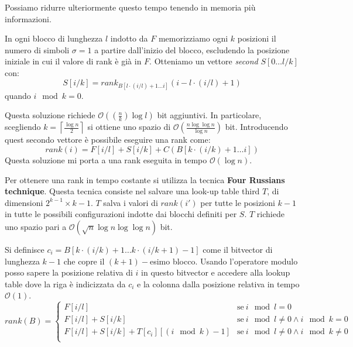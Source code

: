 Possiamo ridurre ulteriormente questo tempo tenendo in memoria più informazioni. 

In ogni blocco di lunghezza $l$ indotto da $F$ memorizziamo ogni $k$ posizioni il numero di simboli $\sigma = 1$ a partire dall'inizio del blocco, escludendo la posizione iniziale in cui il valore di rank è già in $F$. Otteniamo un vettore \textit{second} $S[0 \dots l /k]$ con:
\begin{equation}
    S[i/k] = rank_{B[l \cdot (i / l) + 1 \dots i]} (i - l \cdot (i / l) + 1)
\end{equation} quando $i \mod k = 0$.

Questa soluzione richiede $\mathcal{O}((\frac{n}{k}) \log l)$ bit aggiuntivi. In particolare, scegliendo $k = \left\lceil \frac{\log n}{2} \right\rceil$ si ottiene uno spazio di $\mathcal{O}(\frac{n \log \log n}{\log n})$ bit. Introducendo quest secondo vettore è possibile eseguire una rank come:
\begin{equation}
    rank(i) = F[i/l] + S[i /k] + C(B[k \cdot (i / k) + 1 \dots i])
\end{equation}
Questa soluzione mi porta a una rank eseguita in tempo $\mathcal{O}(\log n )$.

Per ottenere una rank in tempo costante si utilizza la tecnica \textbf{Four Russians technique}. Questa tecnica consiste nel salvare una look-up table third $T$, di dimensioni $2^{k - 1} \times k - 1$. $T$ salva i valori di $rank(i')$ per tutte le posizioni $k - 1$ in tutte le possibili configurazioni indotte dai blocchi definiti per $S$. $T$ richiede uno spazio pari a $\mathcal{O}(\sqrt{n} \log n \log \log n)$ bit.

Si definisce $c_i = B[k \cdot (i / k) + 1 \dots k \cdot (i / k + 1) - 1]$ come il bitvector di lunghezza $k - 1$ che copre il $(k + 1)-$esimo blocco. Usando l'operatore modulo posso sapere la posizione relativa di $i$ in questo bitvector e accedere alla lookup table dove la riga è indicizzata da $c_i$ e la colonna dalla posizione relativa in tempo $\mathcal{O}(1)$.
\begin{equation}
    rank(B) = \begin{cases}
        F[i/l] & \text{se} \ i \mod l = 0 \\
        F[i/l] + S[i/k] & \text{se} \ i \mod l \neq 0 \land i \mod k = 0 \\
        F[i/l] + S[i/k] + T[c_i][(i \mod k) - 1]& \text{se} \ i \mod l \neq 0 \land i \mod k \neq 0 \\
    \end{cases}
\end{equation}

